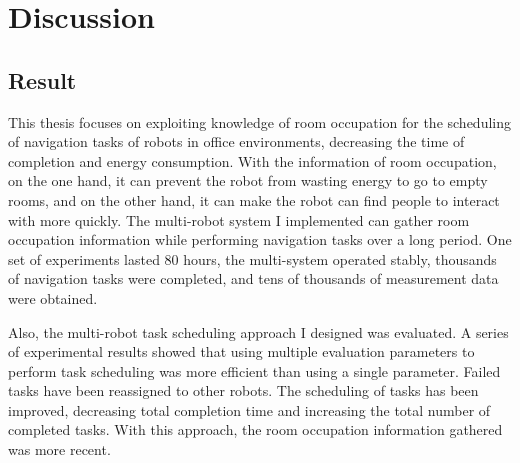 






\chapter{Discussion}


\section{Result}
\label{sec:conclusion}
This thesis focuses on exploiting knowledge of room occupation for the scheduling of navigation tasks of robots in office environments,
decreasing the time of completion and energy consumption. With the information of room occupation, on the one hand, it can prevent the robot from wasting energy to go to empty rooms, and on the other hand, it can make the robot can find people to interact with more quickly. The multi-robot system I implemented can gather room occupation information while performing navigation tasks over a long period. One set of experiments lasted 80 hours, the multi-system operated stably, thousands of navigation tasks were completed, and tens of thousands of measurement data were obtained. 

Also, the multi-robot task scheduling approach I designed was evaluated.
A series of experimental results showed that using multiple evaluation parameters to perform task scheduling was more efficient than using a single parameter. Failed tasks have been reassigned to other robots. The scheduling of tasks has been improved, decreasing total completion time and increasing the total number of completed tasks. With this approach, the room occupation information gathered was more recent.
